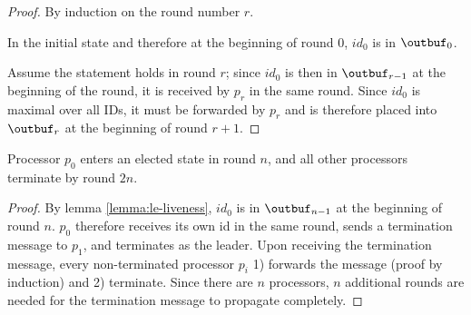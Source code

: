 \begin{proof}
By induction on the round number $r$.

In the initial state and therefore at the beginning of round $0$, $id_0$ is in $\outbuf_0$.

Assume the statement holds
in round $r$; since $id_0$ is then in $\outbuf_{r-1}$ at the beginning of the round, it is received
by $p_r$ in the same round. Since $id_0$ is maximal over all IDs, it must be forwarded by $p_r$
and is therefore placed into $\outbuf_r$ at the beginning of round $r + 1$.
\end{proof}

\begin{theorem}
Processor $p_0$ enters an elected state in round $n$, and all other processors terminate
by round $2n$.
\end{theorem}

\begin{proof}
By lemma \ref{lemma:le-liveness}, $id_0$ is in $\outbuf_{n-1}$ at the beginning of round $n$.
$p_0$ therefore receives its own id in the same round, sends a termination message to $p_1$,
and terminates as the leader. Upon receiving the termination message, every non-terminated
processor $p_i$ 1) forwards the message (proof by induction) and 2) terminate. Since there are
$n$ processors, $n$ additional rounds are needed for the termination message to propagate completely.
\end{proof}

